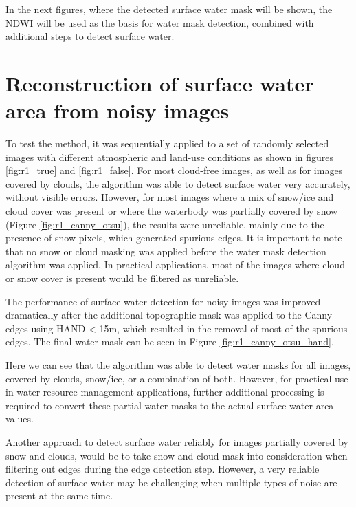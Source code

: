 In the next figures, where the detected surface water mask will be shown, the \gls{NDWI} will be used as the basis for water mask detection, combined with additional steps to detect surface water. 

\section{Reconstruction of surface water area from noisy images}

To test the method, it was sequentially applied to a set of randomly selected images with different atmospheric and land-use conditions as shown in figures \ref{fig:r1_true} and \ref{fig:r1_false}. For most cloud-free images, as well as for images covered by clouds, the algorithm was able to detect surface water very accurately, without visible errors. However, for most images where a mix of snow/ice and cloud cover was present or where the waterbody was partially covered by snow (Figure \ref{fig:r1_canny_otsu}), the results were unreliable, mainly due to the presence of snow pixels, which generated spurious edges. It is important to note that no snow or cloud masking was applied before the water mask detection algorithm was applied. In practical applications, most of the images where cloud or snow cover is present would be filtered as unreliable.

The performance of surface water detection for noisy images was improved dramatically after the additional topographic mask was applied to the Canny edges using HAND < 15m, which resulted in the removal of most of the spurious edges. The final water mask can be seen in Figure \ref{fig:r1_canny_otsu_hand}.

Here we can see that the algorithm was able to detect water masks for all images, covered by clouds, snow/ice, or a combination of both. However, for practical use in water resource management applications, further additional processing is required to convert these partial water masks to the actual surface water area values.

Another approach to detect surface water reliably for images partially covered by snow and clouds, would be to take snow and cloud mask into consideration when filtering out edges during the edge detection step. However, a very reliable detection of surface water may be challenging when multiple types of noise are present at the same time.

\newpage

\begin{comment}
\begin{figure}[H]
	\centering
	\texttt{[image: 01.2-water-detection/figures/PC\_NDWI\_0]}
	\caption{NDWI=0}
	\label{fig:r1_ndwi0}
\end{figure}
\end{comment}

